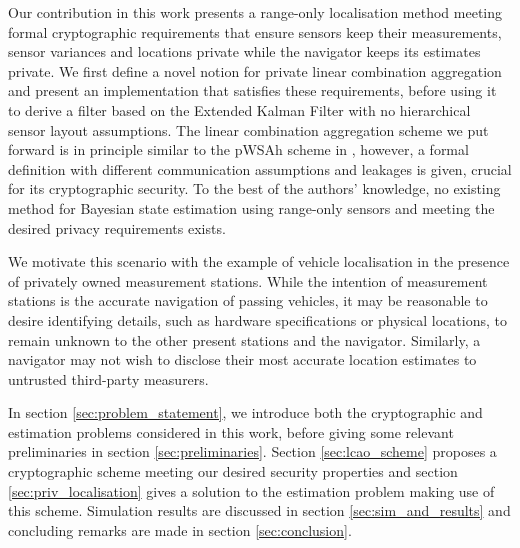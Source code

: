 \documentclass[10pt,letterpaper,oneside,twocolumn,journal]{IEEEtran}
\theoremstyle{definition}
\theoremstyle{definition}
\theoremstyle{remark}
\begin{document}
Our contribution in this work presents a range-only localisation method meeting formal cryptographic requirements that ensure sensors keep their measurements, sensor variances and locations private while the navigator keeps its estimates private. We first define a novel notion for private linear combination aggregation and present an implementation that satisfies these requirements, before using it to derive a filter based on the Extended Kalman Filter with no hierarchical sensor layout assumptions. The linear combination aggregation scheme we put forward is in principle similar to the pWSAh scheme in \cite{alexandruPrivateWeightedSum2020}, however, a formal definition with different communication assumptions and leakages is given, crucial for its cryptographic security. To the best of the authors' knowledge, no existing method for Bayesian state estimation using range-only sensors and meeting the desired privacy requirements exists.

We motivate this scenario with the example of vehicle localisation in the presence of privately owned measurement stations. While the intention of measurement stations is the accurate navigation of passing vehicles, it may be reasonable to desire identifying details, such as hardware specifications or physical locations, to remain unknown to the other present stations and the navigator. Similarly, a navigator may not wish to disclose their most accurate location estimates to untrusted third-party measurers.

In section \ref{sec:problem_statement}, we introduce both the cryptographic and estimation problems considered in this work, before giving some relevant preliminaries in section \ref{sec:preliminaries}. Section \ref{sec:lcao_scheme} proposes a cryptographic scheme meeting our desired security properties and section \ref{sec:priv_localisation} gives a solution to the estimation problem making use of this scheme. Simulation results are discussed in section \ref{sec:sim_and_results} and concluding remarks are made in section \ref{sec:conclusion}.

% 
% 
\end{document}
